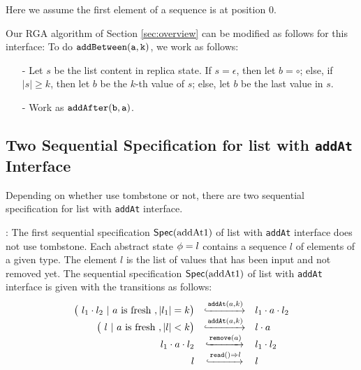 Here we assume the first element of a sequence is at position $0$. 

Our RGA algorithm of Section \ref{sec:overview} can be modified as follows for this interface: To do $\alabelshort[{\tt addBetween}]{a,k}$, we work as follows: 

\begin{itemize}
\setlength{\itemsep}{0.5pt}
\item[-] Let $s$ be the list content in replica state. If $s = \epsilon$, then let $b = \circ$; else, if $\vert s \vert \geq k$, then let $b$ be the $k$-th value of $s$; else, let $b$ be the last value in $s$.

\item[-] Work as $\alabelshort[{\tt addAfter}]{b,a}$. 
\end{itemize} 



\subsection{Two Sequential Specification for list with {\tt addAt} Interface}
\label{subsec:two sequential specification for list with addAt interface} 

Depending on whether use tombstone or not, there are two sequential specification for list with {\tt addAt} interface. 

: The first sequential specification $\specAddatOne$ of list with {\tt addAt} interface does not use tombstone. Each abstract state $\abstate = l$ contains a sequence $l$ of elements of a given type. The element $l$ is the list of values that has been input and not removed yet. The sequential specification $\specAddatOne$ of list with {\tt addAt} interface is given with the transitions as follows:
\[
  \begin{array}{rcl}
    \big(\ l_1 \cdot l_2 \ |\ a\text{ is fresh}\ , \vert l_1 \vert = k \big)
     & \specarrow{\alabelshort[\mathtt{addAt}]{a,k}}
     & l_1 \cdot a \cdot l_2 \\
      \big(\ l \ |\ a\text{ is fresh}\ , \vert l \vert < k \big)
     & \specarrow{\alabelshort[\mathtt{addAt}]{a,k}}
     & l \cdot a \\
     l_1 \cdot a \cdot l_2 
     & \specarrow{\alabelshort[\mathtt{remove}]{a}}
     & l_1 \cdot l_2 \\
     l
     & \specarrow{\alabellong[\mathtt{read}]{}{l}{}}
     & l
   \end{array}
\]

